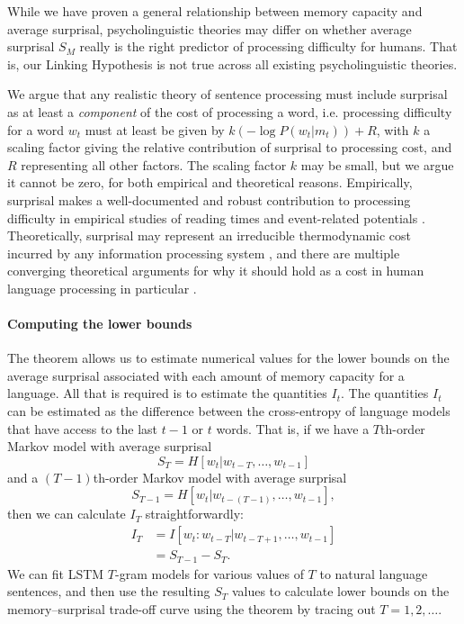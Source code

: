 While we have proven a general relationship between memory capacity and average surprisal, psycholinguistic theories may differ on whether average surprisal $S_M$ really is the right predictor of processing difficulty for humans. That is, our Linking Hypothesis is not true across all existing psycholinguistic theories. 

We argue that any realistic theory of sentence processing must include surprisal as at least a \emph{component} of the cost of processing a word, i.e. processing difficulty for a word $w_t$ must at least be given by $k (-\log P(w_t |m_t)) + R$, with $k$ a scaling factor giving the relative contribution of surprisal to processing cost, and $R$ representing all other factors. The scaling factor $k$ may be small, but we argue it cannot be zero, for both empirical and theoretical reasons. Empirically, surprisal makes a well-documented and robust contribution to processing difficulty in empirical studies of reading times and event-related potentials \citep{smith2013effect,frank2016erp}. Theoretically, surprisal may represent an irreducible thermodynamic cost incurred by any information processing system \citep{brillouin,still2012thermodynamic,zenon2019information}, and there are multiple converging theoretical arguments for why it should hold as a cost in human language processing in particular \citep{levy2013memory}.


\paragraph{Computing the lower bounds}
The theorem allows us to estimate numerical values for the lower bounds on the average surprisal associated with each amount of memory capacity for a language.
All that is required is to estimate the quantities $I_t$.
The quantities $I_t$ can be estimated as the difference between the cross-entropy of language models that have access to the last $t-1$ or $t$ words.
That is, if we have a $T$th-order Markov model with average surprisal
\begin{equation}
    S_T = H[w_t | w_{t-T}, \dots, w_{t-1}]
\end{equation}
and a $(T-1)$th-order Markov model with average surprisal
\begin{equation}
    S_{T-1} = H[w_t | w_{t-(T-1)}, \dots, w_{t-1}],
\end{equation}
then we can calculate $I_T$ straightforwardly:
\begin{align}
    I_T &= I[w_t : w_{t-T} | w_{t-T+1}, \dots, w_{t-1}] \\
    &= S_{T-1} - S_T.
\end{align}
We can fit LSTM $T$-gram models for various values of $T$ to natural language sentences, and then use the resulting $S_T$ values to calculate lower bounds on the memory--surprisal trade-off curve using the theorem by tracing out $T=1, 2, \dots$.



